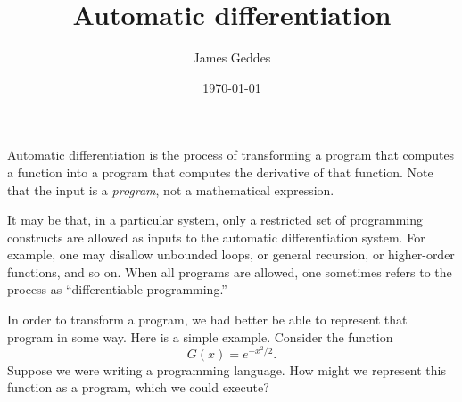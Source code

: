 \documentclass[11pt, a4paper]{article}
\title{Automatic differentiation}
\author{James Geddes}
\date{\today}
\begin{document}
\maketitle

Automatic differentiation is the process of transforming a program
that computes a function into a program that computes the derivative
of that function. Note that the input is a \emph{program}, not a
mathematical expression.

It may be that, in a particular system, only a restricted set of
programming constructs are allowed as inputs to the automatic
differentiation system. For example, one may disallow unbounded loops,
or general recursion, or higher-order functions, and so on. When all
programs are allowed, one sometimes refers to the process as
``differentiable programming.''

In order to transform a program, we had better be able to represent
that program in some way. Here is a simple example. Consider the
function
\begin{equation}
  \label{eq:gaussian-example}
  G(x) = e^{-x^2/2}.
\end{equation}
Suppose we were writing a programming language. How might we represent
this function as a program, which we could execute?
\end{document}

